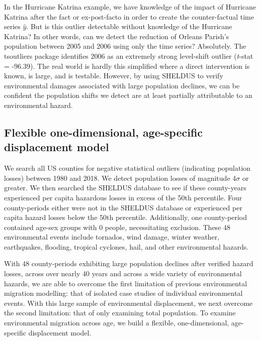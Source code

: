 \documentclass[12pt]{article}
\begin{document}
In the Hurricane Katrina example, we have knowledge of the impact of
Hurricane Katrina after the fact or ex-post-facto in order to create the
counter-factual time series \(\hat{y}\). But is this outlier detectable
without knowledge of the Hurricane Katrina? In other words, can we
detect the reduction of Orleans Parish's population between 2005 and
2006 using only the time series? Absolutely. The tsoutliers package
identifies 2006 as an extremely strong level-shift outlier
(\emph{t}-stat = -96.39). The real world is hardly this simplified where
a direct intervention is known, is large, and is testable. However, by
using SHELDUS to verify environmental damages associated with large
population declines, we can be confident the population shifts we detect
are at least partially attributable to an environmental hazard.

\hypertarget{flexible-one-dimensional-age-specific-displacement-model}{%
\subsection{Flexible one-dimensional, age-specific displacement
model}\label{flexible-one-dimensional-age-specific-displacement-model}}

We search all US counties for negative statistical outliers (indicating
population losses) between 1980 and 2018. We detect population losses of
magnitude 4\(\sigma\) or greater. We then searched the SHELDUS database
to see if these county-years experienced per capita hazardous losses in
excess of the 50th percentile. Four county-periods either were not in
the SHELDUS database or experienced per capita hazard losses below the
50th percentile. Additionally, one county-period contained age-sex
groups with 0 people, necessitating exclusion. These 48 environmental
events include tornados, wind damage, winter weather, earthquakes,
flooding, tropical cyclones, hail, and other environmental hazards.

With 48 county-periods exhibiting large population declines after
verified hazard losses, across over nearly 40 years and across a wide
variety of environmental hazards, we are able to overcome the first
limitation of previous environmental migration modelling: that of
isolated case studies of individual environmental events. With this
large sample of environmental displacement, we next overcome the second
limitation: that of only examining total population. To examine
environmental migration across age, we build a flexible,
one-dimensional, age-specific displacement model.
\end{document}
